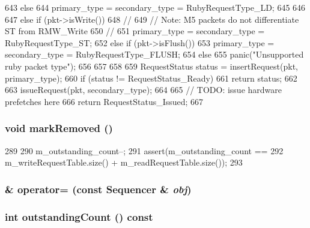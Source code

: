 \begin{DoxyCode}
{{{{{643                 } else {
644                     primary_type = secondary_type = RubyRequestType_LD;
645                 }
646             }
647         } else if (pkt->isWrite()) {
648             //
649             // Note: M5 packets do not differentiate ST from RMW_Write
650             //
651             primary_type = secondary_type = RubyRequestType_ST;
652         } else if (pkt->isFlush()) {
653           primary_type = secondary_type = RubyRequestType_FLUSH;
654         } else {
655             panic("Unsupported ruby packet type\n");
656         }
657     }
658 
659     RequestStatus status = insertRequest(pkt, primary_type);
660     if (status != RequestStatus_Ready)
661         return status;
662 
663     issueRequest(pkt, secondary_type);
664 
665     // TODO: issue hardware prefetches here
666     return RequestStatus_Issued;
667 }
\end{DoxyCode}
\hypertarget{classSequencer_a2e67c7ecd7fa83154e841e80a502130d}{
\subsubsection[{markRemoved}]{\setlength{\rightskip}{0pt plus 5cm}void markRemoved ()}}
\label{classSequencer_a2e67c7ecd7fa83154e841e80a502130d}



\begin{DoxyCode}
289 {
290     m_outstanding_count--;
291     assert(m_outstanding_count ==
292            m_writeRequestTable.size() + m_readRequestTable.size());
293 }
\end{DoxyCode}
\hypertarget{classSequencer_ad3a4eee2c15f83ff25ee60d438602e6b}{
\subsubsection[{operator=}]{\& operator= (const {\bf Sequencer} \& {\em obj})}}
\label{classSequencer_ad3a4eee2c15f83ff25ee60d438602e6b}
\hypertarget{classSequencer_ae47593dc86baa86bf047ad1fbcdcceed}{
\subsubsection[{outstandingCount}]{\setlength{\rightskip}{0pt plus 5cm}int outstandingCount () const}}
\label{classSequencer_ae47593dc86baa86bf047ad1fbcdcceed}



